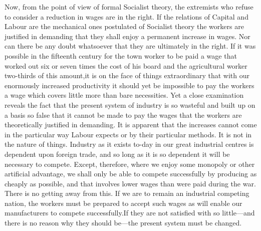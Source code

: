 \documentclass{book}
\begin{document}
Now, from the point of view of formal Socialist theory, the extremists who refuse to consider a reduction in wages are in the right. If the relations of Capital and Labour are the mechanical ones postulated of Socialist theory the workers are justified in demanding that they shall enjoy a permanent increase in wages. Nor can there be any doubt whatsoever that they are ultimately in the right. If it was possible in the fifteenth century for the town worker to be paid a wage that worked out six or seven times the cost of his board and the agricultural worker two-thirds of this amount,\footnotemark[1] it is on the face of things extraordinary that with our enormously increased productivity it should yet be impossible to pay the workers a wage which covers little more than bare necessities. Yet a close examination reveals the fact that the present system of industry is so wasteful and built up on a basis so false that it cannot be made to pay the wages that the workers are theoretically justified in demanding. It is apparent that the increases cannot come in the particular way Labour expects or by their particular methods. It is not in the nature of things. Industry as it exists to-day in our great industrial centres is dependent upon foreign trade, and so long as it is so dependent it will be necessary to compete. Except, therefore, where we enjoy some monopoly or other artificial advantage, we shall only be able to compete successfully by producing as cheaply as possible, and that involves lower wages than were paid during the war. There is no getting away from this. If we are to remain an industrial competing nation, the workers must be prepared to accept such wages as will enable our manufacturers to compete successfully.\footnotemark[2] If they are not satisfied with so little—and there is no reason why they should be—the present system must be changed.
\end{document}

